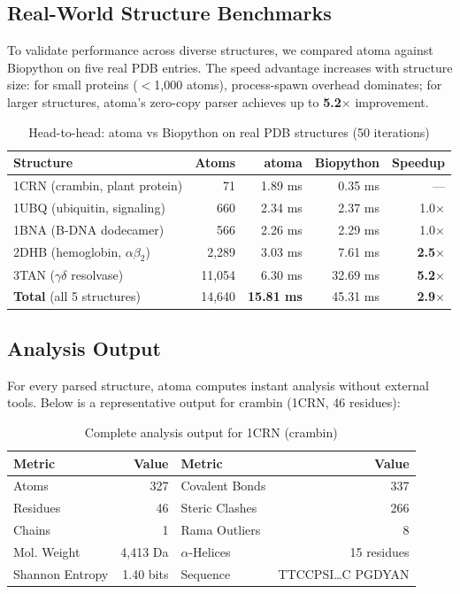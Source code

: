 \documentclass[11pt,a4paper]{article}
\begin{document}
\subsection{Real-World Structure Benchmarks}

To validate performance across diverse structures, we compared atoma against Biopython on five real PDB entries. The speed advantage increases with structure size: for small proteins ($<$1,000 atoms), process-spawn overhead dominates; for larger structures, atoma's zero-copy parser achieves up to \textbf{5.2$\times$} improvement.

\begin{table}[h]
\centering
\caption{Head-to-head: atoma vs Biopython on real PDB structures (50 iterations)}
\begin{tabular}{lrrrr}
\toprule
\textbf{Structure} & \textbf{Atoms} & \textbf{atoma} & \textbf{Biopython} & \textbf{Speedup} \\
\midrule
1CRN (crambin, plant protein)      & 71    & 1.89 ms & 0.35 ms & --- \\
1UBQ (ubiquitin, signaling)        & 660   & 2.34 ms & 2.37 ms & 1.0$\times$ \\
1BNA (B-DNA dodecamer)             & 566   & 2.26 ms & 2.29 ms & 1.0$\times$ \\
2DHB (hemoglobin, $\alpha\beta_2$) & 2,289 & 3.03 ms & 7.61 ms & \textbf{2.5}$\times$ \\
3TAN ($\gamma\delta$ resolvase)    & 11,054& 6.30 ms & 32.69 ms & \textbf{5.2}$\times$ \\
\midrule
\textbf{Total} (all 5 structures)  & 14,640& \textbf{15.81 ms} & 45.31 ms & \textbf{2.9}$\times$ \\
\bottomrule
\end{tabular}
\end{table}

\subsection{Analysis Output}

For every parsed structure, atoma computes instant analysis without external tools. Below is a representative output for crambin (1CRN, 46 residues):

\begin{table}[h]
\centering
\caption{Complete analysis output for 1CRN (crambin)}
\begin{tabular}{lrlr}
\toprule
\textbf{Metric} & \textbf{Value} & \textbf{Metric} & \textbf{Value} \\
\midrule
Atoms       & 327    & Covalent Bonds   & 337 \\
Residues    & 46     & Steric Clashes   & 266 \\
Chains      & 1      & Rama Outliers    & 8 \\
Mol. Weight & 4,413 Da & $\alpha$-Helices & 15 residues \\
Shannon Entropy & 1.40 bits & Sequence & \footnotesize TTCCPSI\ldots C PGDYAN \\
\bottomrule
\end{tabular}
\end{table}
\end{document}
